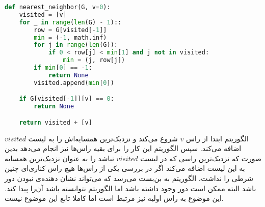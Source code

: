\documentclass[]{article}
\begin{document}
\begin{latin}
\begin{lstlisting}[language=python]
def nearest_neighbor(G, v=0):
    visited = [v]
    for _ in range(len(G) - 1)::
        row = G[visited[-1]]
        min = (-1, math.inf)
        for j in range(len(G)):
            if 0 < row[j] < min[1] and j not in visited:
                min = (j, row[j])
        if min[0] == -1:
            return None
        visited.append(min[0])

    if G[visited[-1]][v] == 0:
        return None

    return visited + [v]
\end{lstlisting}
\end{latin}
الگوریتم ابتدا از راس $v$ شروع می‌کند و
نزدیک‌ترین همسایه‌اش را به لیست $visited$ اضافه می‌کند.
سپس الگوریتم این کار را برای بقیه راس‌ها نیز انجام می‌دهد بدین صورت که
نزدیک‌ترین راسی که در لیست $visited$ نباشد را به عنوان نزدیک‌ترین همسایه به این لیست اضافه می‌کند
اگر در بررسی یکی از راس‌ها هیچ راس کناری‌ای چنین شرطی را نداشت، الگوریتم به بن‌بست می‌رسد
که می‌تواند نشان دهنده‌ی نبودن دور باشد البته ممکن است دور وجود داشته باشد
اما الگوریتم نتوانسته باشد آن‌را پیدا کند. این موضوع به راس اولیه نیز مرتبط است اما
کاملا تابع این موضوع نیست.
\end{document}
